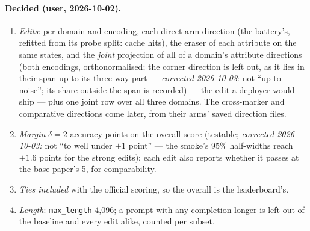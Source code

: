 \documentclass{article}
\begin{document}
\paragraph{Decided (user, 2026-10-02).}
\begin{enumerate}
  \item \emph{Edits}: per domain and encoding, each direct-arm direction (the battery's, refitted from its probe split:
        cache hits), the \leace{} eraser of each attribute on the same states, and the \emph{joint} projection of all of
        a domain's attribute directions (both encodings, orthonormalised; the corner direction is left out, as it lies
        in their span up to its three-way part --- \emph{corrected 2026-10-03}: not ``up to noise''; its share outside
        the span is recorded) --- the edit a deployer would ship --- plus one joint row over all three domains. The
        cross-marker and comparative directions come later, from their arms' saved direction files.
  \item \emph{Margin} $\delta = 2$ accuracy points on the overall score (testable; \emph{corrected 2026-10-03:} not
        ``to well under $\pm1$ point'' --- the smoke's 95\% half-widths reach $\pm1.6$ points for the strong edits);
        each edit also reports whether it passes at the base paper's 5, for comparability.
  \item \emph{Ties included} with the official scoring, so the overall is the leaderboard's.
  \item \emph{Length}: \texttt{max\_length} 4{,}096; a prompt with any completion longer is left out of the baseline
        and every edit alike, counted per subset.
\end{enumerate}
\end{document}
